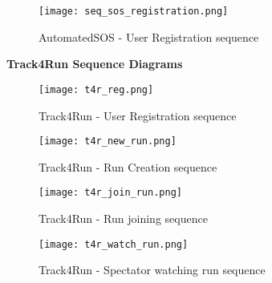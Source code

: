 \begin{figure}
	\texttt{[image: seq\_sos\_registration.png]}
	\caption{AutomatedSOS - User Registration sequence}
	\label{AutomatedSOS - User Registration sequence}
\end{figure} 

\FloatBarrier
\textbf{Track4Run Sequence Diagrams}

\begin{figure}[H]
	\texttt{[image: t4r\_reg.png]}
	\caption{Track4Run - User Registration sequence}
	\label{Track4Run - User Registration sequence}
\end{figure}

\begin{figure}
	\texttt{[image: t4r\_new\_run.png]}
	\caption{Track4Run - Run Creation sequence}
	\label{Track4Run - Run Creation sequence}
\end{figure}

\begin{figure}
	\texttt{[image: t4r\_join\_run.png]}
	\caption{Track4Run - Run joining sequence}
	\label{Track4Run - Run joining sequence}
\end{figure}

\begin{figure}
	\texttt{[image: t4r\_watch\_run.png]}
	\caption{Track4Run - Spectator watching run sequence}
	\label{Track4Run - Spectator watching run sequence}
\end{figure}